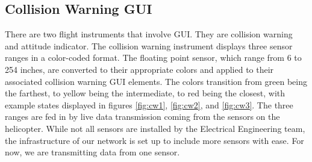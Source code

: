 \documentclass[onecolumn, oneside, letterpaper, draftclsnofoot, 10pt, compsoc]{IEEEtran}
\begin{document}
\subsection{Collision Warning GUI}
\noindent
There are two flight instruments that involve GUI. They are collision warning and attitude indicator. The collision warning instrument displays three sensor ranges in a color-coded format. The floating point sensor, which range from 6 to 254 inches, are converted to their appropriate colors and applied to their associated collision warning GUI elements. The colors transition from green being the farthest, to yellow being the intermediate, to red being the closest, with example states displayed in figures \ref{fig:cw1}, \ref{fig:cw2}, and \ref{fig:cw3}. The three ranges are fed in by live data transmission coming from the sensors on the helicopter. While not all sensors are installed by the Electrical Engineering team, the infrastructure of our network is set up to include more sensors with ease. For now, we are transmitting data from one sensor.
\end{document}
